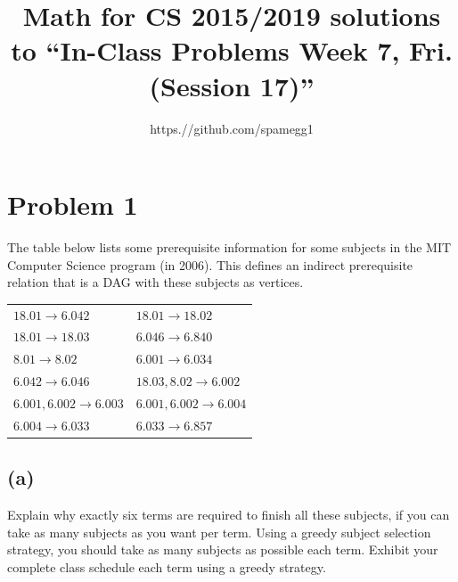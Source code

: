 \documentclass[14pt]{extarticle}
\title{Math for CS 2015/2019 solutions to ``In-Class Problems Week 7, Fri. (Session 17)''}
\author{https.//github.com/spamegg1}
\begin{document}
\maketitle
\tableofcontents

\section{Problem 1}
The table below lists some prerequisite information for some subjects in the MIT Computer Science program (in 2006). This defines an indirect prerequisite relation that is a DAG with these subjects as vertices.

\begin{center}
\begin{tabular}{ll}
$18.01 \to 6.042$ & $18.01 \to 18.02$ \\
$18.01 \to 18.03$ & $6.046 \to 6.840$ \\
$8.01 \to 8.02$ & $6.001 \to 6.034$ \\
$6.042 \to 6.046$ & $18.03, 8.02 \to 6.002$ \\
$6.001, 6.002 \to 6.003$ & $6.001, 6.002 \to 6.004$ \\
$6.004 \to 6.033$ & $6.033 \to 6.857$
\end{tabular}
\end{center}

\subsection{(a)}
Explain why exactly six terms are required to finish all these subjects, if you can take as many subjects as you want per term. Using a greedy subject selection strategy, you should take as many subjects as possible each term. Exhibit your complete class schedule each term using a greedy strategy.
\end{document}
